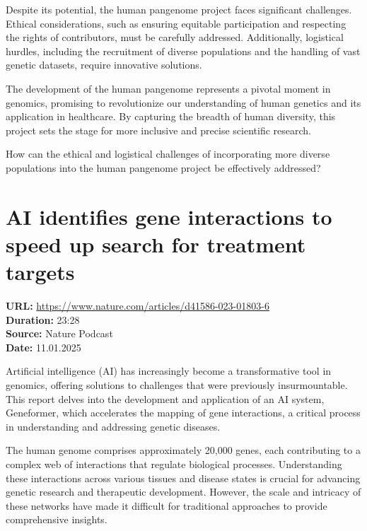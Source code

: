 \documentclass[12pt]{article}
\begin{document}
Despite its potential, the human pangenome project faces significant challenges. Ethical considerations, such as ensuring equitable participation and respecting the rights of contributors, must be carefully addressed. Additionally, logistical hurdles, including the recruitment of diverse populations and the handling of vast genetic datasets, require innovative solutions.

The development of the human pangenome represents a pivotal moment in genomics, promising to revolutionize our understanding of human genetics and its application in healthcare. By capturing the breadth of human diversity, this project sets the stage for more inclusive and precise scientific research.

How can the ethical and logistical challenges of incorporating more diverse populations into the human pangenome project be effectively addressed?



\newpage 





\newpage

\section{AI identifies gene interactions to speed up search for treatment targets}
\textbf{URL:} \url{https://www.nature.com/articles/d41586-023-01803-6}\\
\textbf{Duration:} 23:28\\
\textbf{Source:} Nature Podcast\\
\textbf{Date:} 11.01.2025


 
Artificial intelligence (AI) has increasingly become a transformative tool in genomics, offering solutions to challenges that were previously insurmountable. This report delves into the development and application of an AI system, Geneformer, which accelerates the mapping of gene interactions, a critical process in understanding and addressing genetic diseases.  


The human genome comprises approximately 20,000 genes, each contributing to a complex web of interactions that regulate biological processes. Understanding these interactions across various tissues and disease states is crucial for advancing genetic research and therapeutic development. However, the scale and intricacy of these networks have made it difficult for traditional approaches to provide comprehensive insights.  
\end{document}
